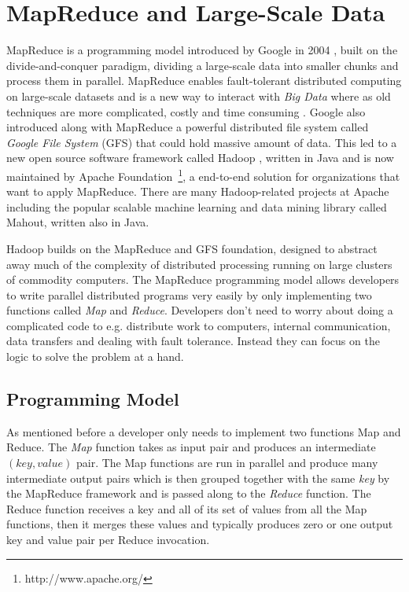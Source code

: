 \section{MapReduce and Large-Scale Data}
\label{sec:MRLargeData}
MapReduce is a programming model introduced by Google in 2004 \citep{Dean:2004}, built on the divide-and-conquer paradigm, dividing a large-scale data into smaller chunks and process them in parallel. MapReduce enables fault-tolerant distributed computing on large-scale datasets and is a new way to interact with \textit{Big Data} where as old techniques are more complicated, costly and time consuming \citep{Dean:2004, schneider2012Hadoop}. Google also introduced along with MapReduce a powerful distributed file system called \textit{Google File System} (GFS) that could hold massive amount of data. This led to a new open source software framework called Hadoop \citep{bialecki2005hadoop}, written in Java and is now maintained by Apache Foundation~\footnote{http://www.apache.org/}, a end-to-end solution for organizations that want to apply MapReduce. There are many Hadoop-related projects at Apache including the popular scalable machine learning and data mining library called Mahout, written also in Java. 

Hadoop builds on the MapReduce and GFS foundation, designed to abstract away much of the complexity of distributed processing running on large clusters of commodity computers. The MapReduce programming model allows developers to write parallel distributed programs very easily by only implementing two functions called \textit{Map} and \textit{Reduce}. Developers don't need to worry about doing a complicated code to e.g. distribute work to computers, internal communication, data transfers and dealing with fault tolerance. Instead they can focus on the logic to solve the problem at a hand.

\subsection{Programming Model}
As mentioned before a developer only needs to implement two functions Map and Reduce. The \textit{Map} function takes as input pair and produces an intermediate $(key,value)$ pair. The Map functions are run in parallel and produce many intermediate output pairs which is then grouped together with the same \textit{key} by the MapReduce framework and is passed along to the \textit{Reduce} function. The Reduce function receives a key and all of its set of values from all the Map functions, then it merges these values and typically produces zero or one output key and value pair per Reduce invocation.

